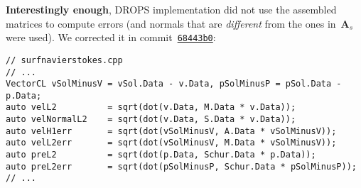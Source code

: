 \documentclass[12pt]{article}
\newcommand{\vect}[1]{\boldsymbol{\mathbf{#1}}}
\begin{document}
\textbf{Interestingly enough}, DROPS implementation did not use the assembled matrices to compute errors (and normals that are \textit{different} from the ones in~$\vect A_s$ were used). We corrected it in commit~\texttt{\href{https://github.com/56th/drops/commit/68443b0a678447ba8b3e7e0af1621e6cd402e5d1}{68443b0}}:
\begin{lstlisting}
// surfnavierstokes.cpp
// ...
VectorCL vSolMinusV = vSol.Data - v.Data, pSolMinusP = pSol.Data - p.Data;
auto velL2          = sqrt(dot(v.Data, M.Data * v.Data));
auto velNormalL2    = sqrt(dot(v.Data, S.Data * v.Data));
auto velH1err       = sqrt(dot(vSolMinusV, A.Data * vSolMinusV));
auto velL2err       = sqrt(dot(vSolMinusV, M.Data * vSolMinusV));
auto preL2          = sqrt(dot(p.Data, Schur.Data * p.Data));
auto preL2err       = sqrt(dot(pSolMinusP, Schur.Data * pSolMinusP));
// ...
\end{lstlisting}



\end{document}
